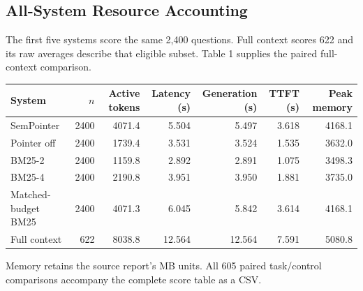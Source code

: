\begin{landscape}
\section{All-System Resource Accounting}
The first five systems score the same 2,400 questions. Full context scores 622 and its raw averages describe that eligible subset. Table 1 supplies the paired full-context comparison.


\begin{tabular}{lrrrrrr}\toprule
System & $n$ & Active tokens & Latency (s) & Generation (s) & TTFT (s) & Peak memory \\ \midrule
SemPointer & 2400 & 4071.4 & 5.504 & 5.497 & 3.618 & 4168.1 \\
Pointer off & 2400 & 1739.4 & 3.531 & 3.524 & 1.535 & 3632.0 \\
BM25-2 & 2400 & 1159.8 & 2.892 & 2.891 & 1.075 & 3498.3 \\
BM25-4 & 2400 & 2190.8 & 3.951 & 3.950 & 1.881 & 3735.0 \\
Matched-budget BM25 & 2400 & 4071.3 & 6.045 & 5.842 & 3.614 & 4168.1 \\
Full context & 622 & 8038.8 & 12.564 & 12.564 & 7.591 & 5080.8 \\
\bottomrule\end{tabular}
Memory retains the source report's MB units. All 605 paired task/control comparisons accompany the complete score table as a CSV.


\end{landscape}

